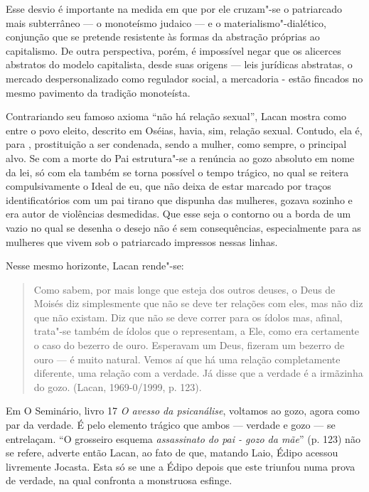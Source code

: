 Esse desvio é importante na medida em que por ele cruzam"-se o
patriarcado mais subterrâneo --- o monoteísmo judaico --- e o
materialismo"-dialético, conjunção que se pretende resistente às formas
da abstração próprias ao capitalismo. De outra perspectiva, porém, é
impossível negar que os alicerces abstratos do modelo capitalista, desde
suas origens --- leis jurídicas abstratas, o mercado despersonalizado
como regulador social, a mercadoria - estão fincados no mesmo pavimento
da tradição monoteísta.

Contrariando seu famoso axioma ``não há relação sexual'', Lacan mostra
como entre o povo eleito, descrito em Oséias, havia, sim, relação
sexual. Contudo, ela é, para , prostituição a ser condenada, sendo a
mulher, como sempre, o principal alvo. Se com a morte do Pai
estrutura"-se a renúncia ao gozo absoluto em nome da lei, só com ela
também se torna possível o tempo trágico, no qual se reitera
compulsivamente o Ideal de eu, que não deixa de estar marcado por traços
identificatórios com um pai tirano que dispunha das mulheres, gozava
sozinho e era autor de violências desmedidas. Que esse seja o contorno
ou a borda de um vazio no qual se desenha o desejo não é sem
consequências, especialmente para as mulheres que vivem sob o
patriarcado impressos nessas linhas.

Nesse mesmo horizonte, Lacan rende"-se:

\begin{quote}
Como sabem, por mais longe que esteja dos outros deuses, o Deus de
Moisés diz simplesmente que não se deve ter relações com eles, mas não
diz que não existam. Diz que não se deve correr para os ídolos mas,
afinal, trata"-se também de ídolos que o representam, a Ele, como era
certamente o caso do bezerro de ouro. Esperavam um Deus, fizeram um
bezerro de ouro --- é muito natural. Vemos aí que há uma relação
completamente diferente, uma relação com a verdade. Já disse que a
verdade é a irmãzinha do gozo. (Lacan, 1969-0/1999, p. 123).
\end{quote}

Em O Seminário, livro 17 \emph{O avesso da psicanálise}, voltamos ao
gozo, agora como par da verdade. É pelo elemento trágico que ambos ---
verdade e gozo --- se entrelaçam. ``O grosseiro esquema \emph{assassinato
do pai - gozo da mãe}'' (p. 123) não se refere, adverte então Lacan, ao
fato de que, matando Laio, Édipo acessou livremente Jocasta. Esta só se
une a Édipo depois que este triunfou numa prova de verdade, na qual
confronta a monstruosa esfinge.

